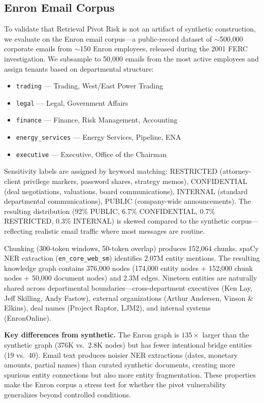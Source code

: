 \documentclass[letterpaper,twocolumn,10pt]{article}
\begin{document}
\subsection{Enron Email Corpus}
\label{sec:enron}

To validate that Retrieval Pivot Risk is not an artifact of synthetic
construction, we evaluate on the Enron email corpus---a public-record
dataset of ${\sim}$500{,}000 corporate emails from ${\sim}$150 Enron
employees, released during the 2001 FERC investigation. We subsample
to 50{,}000 emails from the most active employees and assign tenants
based on departmental structure:

\begin{itemize}
\item \texttt{trading} --- Trading, West/East Power Trading
\item \texttt{legal} --- Legal, Government Affairs
\item \texttt{finance} --- Finance, Risk Management, Accounting
\item \texttt{energy\_services} --- Energy Services, Pipeline, ENA
\item \texttt{executive} --- Executive, Office of the Chairman
\end{itemize}

\noindent Sensitivity labels are assigned by keyword matching:
RESTRICTED (attorney-client privilege markers, password shares,
strategy memos), CONFIDENTIAL (deal negotiations, valuations, board
communications), INTERNAL (standard departmental communications),
PUBLIC (company-wide announcements). The resulting distribution
(92\% PUBLIC, 6.7\% CONFIDENTIAL, 0.7\% RESTRICTED, 0.3\% INTERNAL)
is skewed compared to the synthetic corpus---reflecting realistic
email traffic where most messages are routine.

Chunking (300-token windows, 50-token overlap) produces 152{,}064
chunks. spaCy NER extraction (\texttt{en\_core\_web\_sm}) identifies
2.07M entity mentions. The resulting knowledge graph contains
376{,}000 nodes (174{,}000 entity nodes + 152{,}000 chunk nodes +
50{,}000 document nodes) and 2.3M edges. Nineteen entities are
naturally shared across departmental boundaries---cross-department
executives (Ken Lay, Jeff Skilling, Andy Fastow), external
organizations (Arthur Andersen, Vinson \& Elkins), deal names
(Project Raptor, LJM2), and internal systems (EnronOnline).

\textbf{Key differences from synthetic.} The Enron graph is
$135\times$ larger than the synthetic graph (376K vs.\ 2.8K nodes)
but has fewer intentional bridge entities (19 vs.\ 40). Email text
produces noisier NER extractions (dates, monetary amounts, partial
names) than curated synthetic documents, creating more spurious
entity connections but also more entity fragmentation. These
properties make the Enron corpus a stress test for whether the pivot
vulnerability generalizes beyond controlled conditions.
\end{document}
